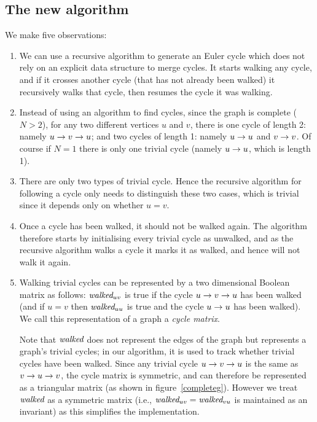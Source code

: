 \documentclass[12pt]{article}
\begin{document}
\subsection{The new algorithm}

\def\pair#1#2{\ifx #1#2
#1\rightarrow #2 %
\else #1\rightarrow#2\rightarrow#1\fi}

We make five observations:

\begin{enumerate}\raggedright
\item
We can use a recursive algorithm to generate an Euler cycle which does not rely on an explicit data structure to merge cycles. It starts walking any cycle, and if it crosses another cycle (that has not already been walked) it recursively walks that cycle, then resumes the cycle it was walking.

\item
Instead of using an algorithm to find cycles, since the graph is complete ($N>2$), for any two different vertices $u$ and $v$, there is one cycle of length 2: namely $\pair uv$; and two cycles of length 1: namely $\pair uu$ and $\pair vv$. Of course if $N=1$ there is only one trivial cycle (namely $\pair uu$, which is length 1).

\item
There are only two types of trivial cycle. Hence the recursive algorithm for following a cycle only needs to distinguish these two cases, which is trivial since it depends only on whether $u=v$.

\item
Once a cycle has been walked, it should not be walked again. The algorithm therefore starts by initialising every trivial cycle as unwalked, and as the recursive algorithm walks a cycle it marks it as walked, and hence will not walk it again.

\item
Walking trivial cycles can be represented by a two dimensional Boolean matrix as follows: $\mbox{\it walked}_{uv}$ is true if the cycle $\pair uv$ has been walked (and if $u=v$ then $\mbox{\it walked}_{uu}$ is true and the cycle $\pair uu$ has been walked). We call this representation of a graph a \emph{cycle matrix}.

Note that $\mbox{\it walked}$ does not represent the edges of the graph but represents a graph's trivial cycles; in our algorithm, it is used to track whether trivial cycles have been walked. Since any trivial cycle $\pair uv$ is the same as $\pair vu$, the cycle matrix is symmetric, and can therefore be represented as a triangular matrix (as shown in figure~\ref{completeg}). However we treat $\mbox{\it walked}$ as a symmetric matrix (i.e., $\mbox{\it walked}_{uv}=\mbox{\it walked}_{vu}$ is maintained as an invariant) as this simplifies the implementation.
\end{enumerate}
\end{document}
